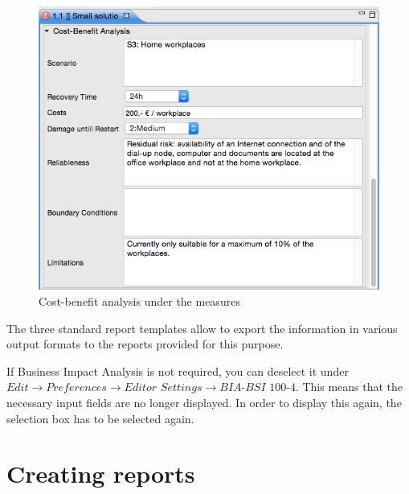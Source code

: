 \documentclass[a4paper,10pt]{book}
\begin{document}
\begin{figure}[!htb]
  \centering
  \includegraphics[width=\linewidth]{Screenshot/cost-benefit-analysis-under-the-measures.png}
  \caption{Cost-benefit analysis under the measures}
  \label{fig:cost-benefit-analysis-under-the-measures}
\end{figure}

The three standard report templates allow to export the information in various
output formats to the reports provided for this purpose.

If Business Impact Analysis is not required, you can deselect it under
$\textit{Edit}\to\textit{Preferences}\to\textit{Editor
Settings}\to\textit{BIA-BSI 100-4}$. This means that the necessary input fields
are no longer displayed. In order to display this again, the selection box has
to be selected again.


\section{Creating reports}
\label{sec:bsi-creating-reports}
\end{document}
